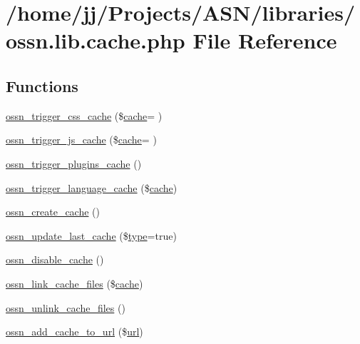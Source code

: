 \hypertarget{ossn_8lib_8cache_8php}{}\section{/home/jj/\+Projects/\+A\+S\+N/libraries/ossn.lib.\+cache.\+php File Reference}
\label{ossn_8lib_8cache_8php}
\subsection*{Functions}
\begin{DoxyCompactItemize}
\item 
\hyperlink{ossn_8lib_8cache_8php_af67a9948f757ab9a094d21801d1f9832}{ossn\+\_\+trigger\+\_\+css\+\_\+cache} (\$\hyperlink{jquery_8tokeninput_8js_a521016aa0ca9ff38bfba60ab069cb34b}{cache}= \textquotesingle{}\textquotesingle{})
\item 
\hyperlink{ossn_8lib_8cache_8php_a733e1f02cd342395f4c7fcf4ff5aa51d}{ossn\+\_\+trigger\+\_\+js\+\_\+cache} (\$\hyperlink{jquery_8tokeninput_8js_a521016aa0ca9ff38bfba60ab069cb34b}{cache}= \textquotesingle{}\textquotesingle{})
\item 
\hyperlink{ossn_8lib_8cache_8php_a16e20c20d8a45d89b5269a0ac05a6302}{ossn\+\_\+trigger\+\_\+plugins\+\_\+cache} ()
\item 
\hyperlink{ossn_8lib_8cache_8php_af5fde870bc3bc4a5a5a346a45b67750e}{ossn\+\_\+trigger\+\_\+language\+\_\+cache} (\$\hyperlink{jquery_8tokeninput_8js_a521016aa0ca9ff38bfba60ab069cb34b}{cache})
\item 
\hyperlink{ossn_8lib_8cache_8php_aaac4818b72ddcd582d2b0c3bc27b9815}{ossn\+\_\+create\+\_\+cache} ()
\item 
\hyperlink{ossn_8lib_8cache_8php_aa6a4b913185ba4f5b3f0a3de6ae2ddaa}{ossn\+\_\+update\+\_\+last\+\_\+cache} (\$\hyperlink{_ossn_wall_2actions_2wall_2post_2group_8php_a2dc1bb4e1ed0029daa81ac0776b14b51}{type}=true)
\item 
\hyperlink{ossn_8lib_8cache_8php_a7f8a781af068e264e7a61125189fa4d5}{ossn\+\_\+disable\+\_\+cache} ()
\item 
\hyperlink{ossn_8lib_8cache_8php_a76a0c1781da3e52af27ed55956f1b171}{ossn\+\_\+link\+\_\+cache\+\_\+files} (\$\hyperlink{jquery_8tokeninput_8js_a521016aa0ca9ff38bfba60ab069cb34b}{cache})
\item 
\hyperlink{ossn_8lib_8cache_8php_a334f443d2fe4f8b650dc36b3d6833325}{ossn\+\_\+unlink\+\_\+cache\+\_\+files} ()
\item 
\hyperlink{ossn_8lib_8cache_8php_a57e6275bb17be7f285833bcc5ea2391a}{ossn\+\_\+add\+\_\+cache\+\_\+to\+\_\+url} (\$\hyperlink{ossn_8config_8site_8example_8php_ad643c3db2725019ef8130393d549e6db}{url})
\end{DoxyCompactItemize}


